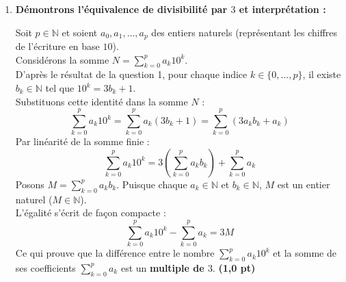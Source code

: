 \documentclass[11pt,a4paper]{article}
\newcommand{\bareme}[1]{\hfill\textbf{\textcolor{secondary}{\sffamily[#1]}}}
\newcommand{\pts}[1]{\textbf{\textcolor{secondary}{\sffamily(#1)}}}
\newcommand{\N}{\mathbb{N}}
\newcommand{\dsp}{\displaystyle}
\begin{document}
\begin{correctionbox}[Corrigé de l'Exercice 5 \bareme{Total : 4 points}]
\begin{enumerate}[label=\textbf{\arabic*.}]
\begin{itemize}[leftmargin=*, label=$\bullet$]
        \item \textbf{Conclusion :} \pts{0,25 pt}\\
        Par le principe de récurrence, pour tout $n \in \N$, il existe un entier $b_n \in \N$ tel que :
        \[
        10^n = 3b_n + 1
        \]
        \emph{Remarque constructive :} On observe que $b_0 = 0$, $b_1 = 3$, $b_2 = 33$, $b_3 = 333$ et d'une manière générale, $b_n = \underbrace{33\dots3}_{n \text{ fois}} = \dfrac{10^n - 1}{3}$.
    \end{itemize}

    \item \textbf{Démontrons l'équivalence de divisibilité par $3$ et interprétation :} \bareme{2,0 pts}

    Soit $p \in \N$ et soient $a_0, a_1, \dots, a_p$ des entiers naturels (représentant les chiffres de l'écriture en base $10$).\\
    Considérons la somme $\dsp N = \sum_{k=0}^p a_k 10^k$.\\
    D'après le résultat de la question 1, pour chaque indice $k \in \{0, \dots, p\}$, il existe $b_k \in \N$ tel que $10^k = 3b_k + 1$.\\
    Substituons cette identité dans la somme $N$ :
    \[
    \sum_{k=0}^p a_k 10^k = \sum_{k=0}^p a_k (3b_k + 1) = \sum_{k=0}^p \left( 3 a_k b_k + a_k \right)
    \]
    Par linéarité de la somme finie :
    \[
    \sum_{k=0}^p a_k 10^k = 3 \left( \sum_{k=0}^p a_k b_k \right) + \sum_{k=0}^p a_k
    \]
    Posons $M = \sum_{k=0}^p a_k b_k$. Puisque chaque $a_k \in \N$ et $b_k \in \N$, $M$ est un entier naturel ($M \in \N$).\\
    L'égalité s'écrit de façon compacte :
    \[
    \sum_{k=0}^p a_k 10^k - \sum_{k=0}^p a_k = 3M
    \]
    Ce qui prouve que la différence entre le nombre $\sum_{k=0}^p a_k 10^k$ et la somme de ses coefficients $\sum_{k=0}^p a_k$ est un \textbf{multiple de $3$}. \pts{1,0 pt}


\end{enumerate}
\end{correctionbox}
\end{document}
